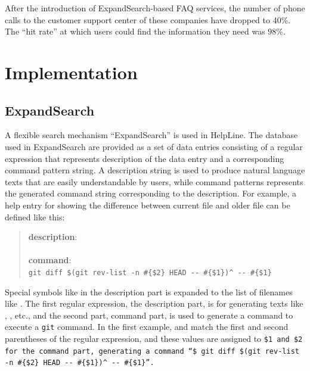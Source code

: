 \documentclass[manuscript,anonymous,review]{acmart}
\def\HL{\textsf{HelpLine}}
\def\GIT{\texttt{git}}
\def\ES{\textsf{ExpandSearch}}
\begin{document}
After the introduction of ExpandSearch-based FAQ services,
the number of phone calls to the customer support center of these companies have
dropped to 40\%.
%
The ``hit rate'' at which users could find the information they need was 98\%.

\section{Implementation}


\subsection{ExpandSearch}

A flexible search mechanism ``{\ES}'' is used in {\HL}.
%
The database used in {\ES} are provided as a set of data entries
consisting of a regular expression that represents description of the data entry
and a corresponding command pattern string.
A description string is used to produce natural language texts
that are easily understandable by users,
while command patterns represents the generated command string
corresponding to the description.
%
For example, a help entry for showing the difference between
current file and older file can be defined like this:

\begin{quote}
  \textbf{description}: \\
  \\
  \textbf{command}: \\
  {\smallfont\verb|git diff $(git rev-list -n #{$2} HEAD -- #{$1})^ -- #{$1}|}
\end{quote}

Special symbols like  in the description part is expanded to
the list of filenames like .
The first regular expression, the description part,
is for generating texts like
, 
, etc.,
and the second part, command part,
is used to generate a command to execute a {\GIT} command.
In the first example,  and 
match the first and second parentheses of the regular expression, and
these values are assigned to \tt{\$1} and \tt{\$2}
for the command part, generating a command
``{\smallfont\verb|$ git diff $(git rev-list -n #{$2} HEAD -- #{$1})^|}
{\smallfont\verb|-- #{$1}|}''.
\end{document}
